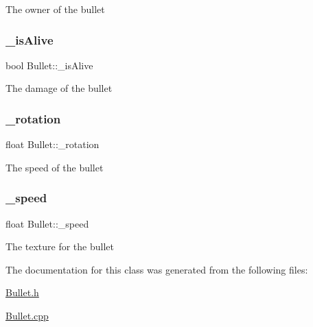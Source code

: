 The owner of the bullet \mbox{\label{class_bullet_a493d2187e18321e4777e3681c5ee07a6}} 
\subsubsection{\texorpdfstring{\+\_\+is\+Alive}{\_isAlive}}
{\footnotesize\ttfamily bool Bullet\+::\+\_\+is\+Alive\hspace{0.3cm}{\ttfamily [private]}}

The damage of the bullet \mbox{\label{class_bullet_a1904e460221accb69ae194fc4eb7d54f}} 
\subsubsection{\texorpdfstring{\+\_\+rotation}{\_rotation}}
{\footnotesize\ttfamily float Bullet\+::\+\_\+rotation\hspace{0.3cm}{\ttfamily [private]}}

The speed of the bullet \mbox{\label{class_bullet_a6a971a89bb69a7e9d5be0955e78d12a5}} 
\subsubsection{\texorpdfstring{\+\_\+speed}{\_speed}}
{\footnotesize\ttfamily float Bullet\+::\+\_\+speed\hspace{0.3cm}{\ttfamily [private]}}

The texture for the bullet 

The documentation for this class was generated from the following files\+:\begin{DoxyCompactItemize}
\item 
\hyperlink{_bullet_8h}{Bullet.\+h}\item 
\hyperlink{_bullet_8cpp}{Bullet.\+cpp}\end{DoxyCompactItemize}
